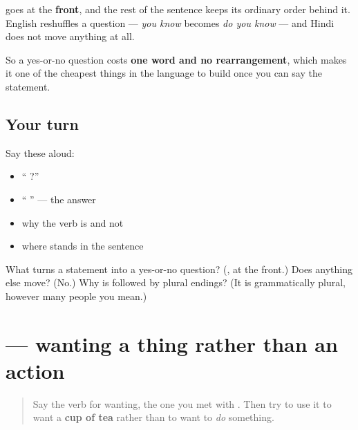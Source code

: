 \begin{grammarlens}[title={Grammar Lens: where \hi{क्या} sits}]
\textbf{} goes at the \textbf{front}, and the rest of the sentence keeps its ordinary order behind it. English reshuffles a question — \emph{you know} becomes \emph{do you know} — and Hindi does not move anything at all.

So a yes-or-no question costs \textbf{one word and no rearrangement}, which makes it one of the cheapest things in the language to build once you can say the statement.
\end{grammarlens}

\subsection*{Your turn}
Say these aloud:

\begin{itemize}
\raggedright
  \item \textquotedblleft{}   ?\textquotedblright{}
  \item \textquotedblleft{}  \textquotedblright{} — the answer
  \item why the verb is \textbf{} and not \textbf{}
  \item where \textbf{} stands in the sentence
\end{itemize}

\begin{tcolorbox}[breakable,colback=teal!4,colframe=teal!35!black,title={Before you move on}]
What turns a statement into a yes-or-no question? (\textbf{}, at the front.) Does anything else move? (No.) Why is \textbf{} followed by plural endings? (It is grammatically plural, however many people you mean.)
\end{tcolorbox}
\section[\texorpdfstring{\hi{चाहिए} (cāhiye)}{चाहिए (cāhiye)}]{ — wanting a thing rather than an action}

\label{lesson:HI-C95-chahiye}



\begin{quote}
Say the verb for wanting, the one you met with \textbf{}. Then try to use it to want a \textbf{cup of tea} rather than to want to \emph{do} something.
\end{quote}

